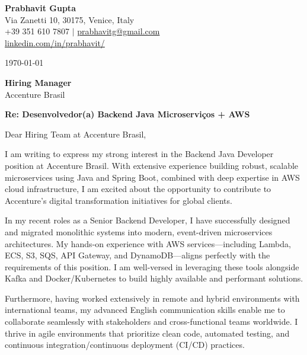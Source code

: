 \documentclass[11pt,a4paper]{article}
\begin{document}
\begin{flushleft}
\textbf{Prabhavit Gupta} \\
Via Zanetti 10, 30175, Venice, Italy \\
+39 351 610 7807 $\vert$ \href{mailto:prabhavitg@gmail.com}{prabhavitg@gmail.com} \\
\href{https://www.linkedin.com/in/prabhavit/}{linkedin.com/in/prabhavit/}
\end{flushleft}

\vspace{1em}
\today

\vspace{1em}
\begin{flushleft}
\textbf{Hiring Manager} \\
Accenture Brasil \\
\end{flushleft}

\vspace{1em}
\noindent \textbf{Re: Desenvolvedor(a) Backend Java Microserviços + AWS}

\vspace{1em}
\noindent Dear Hiring Team at Accenture Brasil,

\vspace{1em}
I am writing to express my strong interest in the Backend Java Developer position at Accenture Brasil. With extensive experience building robust, scalable microservices using Java and Spring Boot, combined with deep expertise in AWS cloud infrastructure, I am excited about the opportunity to contribute to Accenture's digital transformation initiatives for global clients.

\vspace{1em}
In my recent roles as a Senior Backend Developer, I have successfully designed and migrated monolithic systems into modern, event-driven microservices architectures. My hands-on experience with AWS services—including Lambda, ECS, S3, SQS, API Gateway, and DynamoDB—aligns perfectly with the requirements of this position. I am well-versed in leveraging these tools alongside Kafka and Docker/Kubernetes to build highly available and performant solutions. 

\vspace{1em}
Furthermore, having worked extensively in remote and hybrid environments with international teams, my advanced English communication skills enable me to collaborate seamlessly with stakeholders and cross-functional teams worldwide. I thrive in agile environments that prioritize clean code, automated testing, and continuous integration/continuous deployment (CI/CD) practices.
\end{document}
